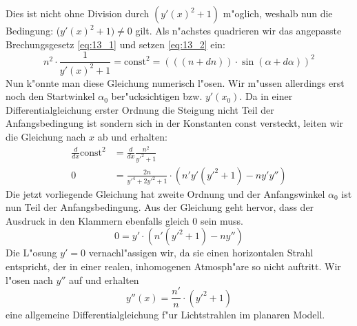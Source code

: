 \begin{refsection}
Dies ist nicht ohne Division durch $(y'(x)^2 + 1)$ m"oglich, weshalb nun die Bedingung: ($y'(x)^2 +1) \neq 0$ gilt.
Als n"achstes quadrieren wir das angepasste Brechungsgesetz \ref{eq:13_1} und setzen \ref{eq:13_2} ein:
$$n^2 \cdot \frac{1}{y'(x)^2 + 1} = \text{const}^2 = (((n + dn)) \cdot \sin(\alpha + d\alpha))^2$$
Nun k"onnte man diese Gleichung numerisch l"osen. 
Wir m"ussen allerdings erst noch den Startwinkel $\alpha_0$ ber"ucksichtigen bzw. $y'(x_0)$.
Da in einer Differentialgleichung erster Ordnung die Steigung nicht Teil der Anfangsbedingung ist sondern sich in der Konstanten $\text{const}$ versteckt, leiten wir die Gleichung nach $x$ ab und erhalten:
\begin{equation}
\begin{aligned}
\frac{d}{dx} \text{const}^2 
& = \frac{d}{dx} \frac{n^2}{y'^2 + 1}  \\
0 
& = \frac{2n}{y'^4 + 2y'^2 + 1} \cdot \left( n'y'(y'^2 + 1) - n y' y'' \right)
\end{aligned}
\end{equation}
Die jetzt vorliegende Gleichung hat zweite Ordnung und der Anfangswinkel $\alpha_0$ ist nun Teil der Anfangsbedingung. 
Aus der Gleichung geht hervor, dass der Ausdruck in den Klammern ebenfalls gleich $0$ sein muss.
$$0 = y' \cdot \left( n' ( y'^2 + 1 ) - n y'' \right)$$ 
Die L"osung $y'=0$ vernachl"assigen wir, da sie einen horizontalen Strahl entspricht, der in einer realen, inhomogenen Atmosph"are so nicht auftritt.
Wir l"osen nach $y''$ auf und erhalten 
\begin{equation} \label{eq:planar_DGL}
y''(x) = \frac{n'}{n} \cdot \left( y'^2 + 1\right)
\end{equation}
eine allgemeine Differentialgleichung f"ur Lichtstrahlen im planaren Modell.


\end{refsection}
